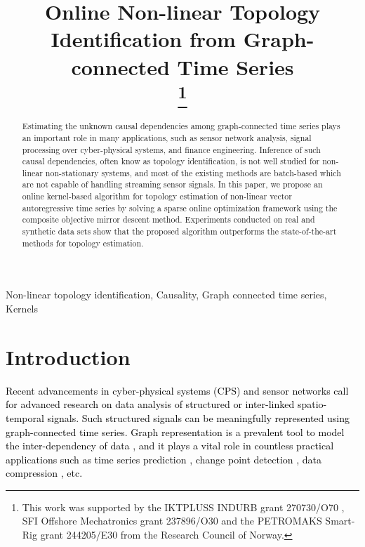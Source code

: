 \documentclass[conference]{IEEEtran}
\newcommand{\cB}[1]{\textcolor{black}{#1}}
\begin{document}
\title{Online Non-linear Topology Identification from Graph-connected Time Series\\
\thanks{This work was supported by the IKTPLUSS INDURB grant 270730/O70 , SFI Offshore Mechatronics grant 237896/O30 and the PETROMAKS Smart-Rig grant 244205/E30 from the Research Council of Norway.}}

\author{
}

\maketitle

\begin{abstract}
 Estimating the unknown causal dependencies among graph-connected time series plays an important role in many applications, such as sensor network analysis, signal processing over cyber-physical systems, and finance engineering.  Inference of such causal dependencies, often know as topology identification, is not well studied for non-linear non-stationary systems, and most of the existing methods are batch-based which  are not capable of handling streaming sensor signals. In this paper, we propose an online kernel-based  algorithm for topology estimation of non-linear vector autoregressive time series by solving a sparse online optimization framework using the composite objective mirror descent method. Experiments conducted on real and synthetic data sets show that the proposed algorithm outperforms the state-of-the-art methods for topology estimation. 
\end{abstract}

\begin{IEEEkeywords}
Non-linear topology identification, Causality, Graph connected time series, Kernels
\end{IEEEkeywords}

\section{Introduction}
\cB{Recent advancements in cyber-physical systems (CPS) and sensor networks call for advanced research on data analysis of structured or inter-linked spatio-temporal signals. Such structured signals can be meaningfully represented using graph-connected time series. Graph representation is a prevalent tool to model the inter-dependency of data \cite{leax.d2019}, and it plays a vital role in countless practical applications such as time  series prediction \cite{onlB.Z2017}, change point detection \cite{dynl.m2018}, data compression \cite{pata.c2018}, etc.}
\end{document}
